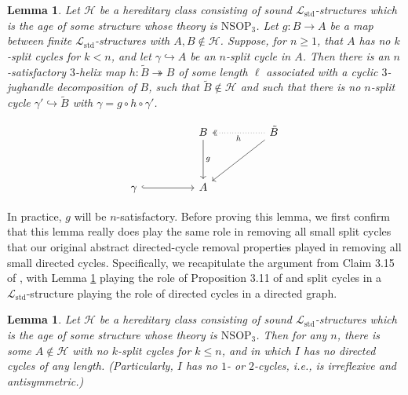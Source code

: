 \documentclass{amsart}
\newtheorem{lemma}[theorem]{Lemma}
\theoremstyle{definition}
\theoremstyle{remark}
\numberwithin{equation}{section}
\begin{document}
\begin{lemma}
    \label{split cycle removal} Let $\mathcal{H}$ be a hereditary class consisting of sound $\mathcal{L}_{\mathrm{std}}$-structures which is the age of some structure whose theory is $\mathrm{NSOP}_{3}$. Let $g: B \to A$ be a map between finite $\mathcal{L}_{\mathrm{std}}$-structures with $A, B\notin \mathcal{H}$. Suppose, for $n \geq 1$, that $A$ has no $k$-split cycles for $k < n$, and let $\gamma \hookrightarrow A$ be an $n$-split cycle in $A$.  Then there is an $n$-satisfactory $3$-helix map $h: \tilde{B} \twoheadrightarrow B$ of some length $\ell$ associated with a cyclic $3$-jughandle decomposition of $B$, such that $\tilde{B} \notin \mathcal{H}$ and such that there is no $n$-split cycle $\gamma' \hookrightarrow \tilde{B}$ with $\gamma = g\circ h\circ \gamma'$.


$$\begin{tikzcd}
                        &  & B \arrow[dd, "g"] &  & \tilde{B} \arrow[ll, two heads, "h", dotted] \arrow[lldd] \\
                        &  &              &  &                                      \\
\gamma \arrow[rr, hook] &  & A            &  &                                     
\end{tikzcd}$$


\end{lemma}

In practice, $g$ will be $n$-satisfactory. Before proving this lemma, we first confirm that this lemma really does play the same role in removing all small split cycles that our original abstract directed-cycle removal properties played in removing all small directed cycles. Specifically, we recapitulate  the argument from Claim 3.15 of \cite{ApproxOrder}, with Lemma \ref{split cycle removal} playing the role of Proposition 3.11 of \cite{ApproxOrder} and split cycles in a $\mathcal{L}_{\mathrm{std}}$-structure playing the role of directed cycles in a directed graph.


\begin{lemma}
 \label{arbitrarily large minimal split cycles}   Let $\mathcal{H}$ be a hereditary class consisting of sound $\mathcal{L}_{\mathrm{std}}$-structures which is the age of some structure whose theory is $\mathrm{NSOP}_{3}$. Then for any $n$, there is some $A \notin \mathcal{H}$ with no $k$-split cycles for $k \leq n$, and in which $I$ has no directed cycles of any length. (Particularly, $I$ has no $1$- or $2$-cycles, i.e., is irreflexive and antisymmetric.)
\end{lemma}
\end{document}
